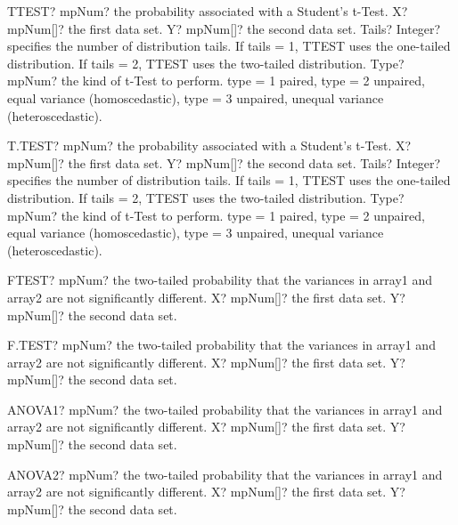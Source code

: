 \documentclass[12pt,a4paper,openany]{book}
\begin{document}
\begin{mpFunctionsExtract}
\mpWorksheetFunctionFourNotImplemented
{TTEST? mpNum? the probability associated with a Student's t-Test.}
{X? mpNum[]? the first data set.}
{Y? mpNum[]? the second data set.}
{Tails? Integer?  specifies the number of distribution tails. If tails = 1, TTEST uses the one-tailed distribution. If tails = 2, TTEST uses the two-tailed distribution.}
{Type? mpNum? the kind of t-Test to perform. type = 1 paired, type = 2 unpaired, equal variance (homoscedastic), type = 3 unpaired, unequal variance (heteroscedastic).}
\end{mpFunctionsExtract}

\begin{mpFunctionsExtract}
\mpWorksheetFunctionFourNotImplemented
{T.TEST? mpNum? the probability associated with a Student's t-Test.}
{X? mpNum[]? the first data set.}
{Y? mpNum[]? the second data set.}
{Tails? Integer?  specifies the number of distribution tails. If tails = 1, TTEST uses the one-tailed distribution. If tails = 2, TTEST uses the two-tailed distribution.}
{Type? mpNum? the kind of t-Test to perform. type = 1 paired, type = 2 unpaired, equal variance (homoscedastic), type = 3 unpaired, unequal variance (heteroscedastic).}
\end{mpFunctionsExtract}

\begin{mpFunctionsExtract}
\mpWorksheetFunctionTwoNotImplemented
{FTEST? mpNum? the two-tailed probability that the variances in array1 and array2 are not significantly different.}
{X? mpNum[]? the first data set.}
{Y? mpNum[]? the second data set.}
\end{mpFunctionsExtract}

\begin{mpFunctionsExtract}
\mpWorksheetFunctionTwoNotImplemented
{F.TEST? mpNum? the two-tailed probability that the variances in array1 and array2 are not significantly different.}
{X? mpNum[]? the first data set.}
{Y? mpNum[]? the second data set.}
\end{mpFunctionsExtract}

\begin{mpFunctionsExtract}
\mpFunctionTwoNotImplemented
{ANOVA1? mpNum? the two-tailed probability that the variances in array1 and array2 are not significantly different.}
{X? mpNum[]? the first data set.}
{Y? mpNum[]? the second data set.}
\end{mpFunctionsExtract}

\begin{mpFunctionsExtract}
\mpFunctionTwoNotImplemented
{ANOVA2? mpNum? the two-tailed probability that the variances in array1 and array2 are not significantly different.}
{X? mpNum[]? the first data set.}
{Y? mpNum[]? the second data set.}
\end{mpFunctionsExtract}
\end{document}
